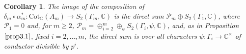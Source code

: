 \documentclass[a4paper,11pt]{amsart}
\numberwithin{equation}{section}
\theoremstyle{plain}
\newtheorem{corollary}[theorem]{Corollary}
\theoremstyle{definition}
\theoremstyle{remark}
\newcommand{\C}{\mathbb{C}}
\newcommand{\Cot}{\mathrm{Cot}}
\begin{document}

\begin{corollary}\label{coro3.3}
The image of the composition of $\delta_m\circ\alpha_m^*\colon \Cot_\C(A_m)\rightarrow S_2(\Gamma_m,\C)$ is the direct sum 
$\mathcal{P}_m\oplus S_2(\Gamma_1,\C)$, where $\mathcal{P}_1=0$ and, for $m\geq 2$, $\mathcal{P}_m=\oplus_{i=2}^m\oplus_\psi S_2(\Gamma_i,\psi,\C)$,
and, as in Proposition $\ref{prop3.1}$, fixed $i=2,\dots,m$, the direct sum is over all characters $\psi\colon \Gamma_i\rightarrow\C^\times$ of conductor divisible by $p^i$. 
\end{corollary}
\end{document}
